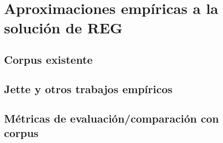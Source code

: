 




\section{Aproximaciones emp\'iricas a la soluci\'on de REG}

\subsection{Corpus existente}
\subsection{Jette y otros trabajos emp\'iricos}
\subsection{M\'etricas de evaluaci\'on/comparaci\'on con corpus}



